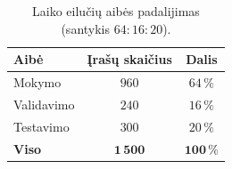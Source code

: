 \begin{table}[H]
    \centering
    \caption{Laiko eilučių aibės padalijimas (santykis $64{:}16{:}20$).}
    \begin{tabular}{|l|c|c|}
        \hline
        Aibė & Įrašų skaičius & Dalis \\
        \hline
        Mokymo & $960$ & $64\,\%$ \\ \hline
        Validavimo & $240$ & $16\,\%$ \\ \hline
        Testavimo & $300$ & $20\,\%$ \\ \hline
        \textbf{Viso} & $\mathbf{1\,500}$ & $\mathbf{100\,\%}$ \\ \hline
    \end{tabular}
    \label{tab:keystroke_split}
\end{table}
